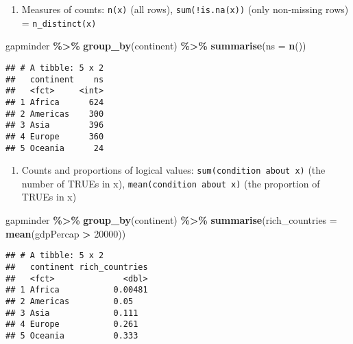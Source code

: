\documentclass[
]{book}
\newenvironment{Shaded}{\begin{snugshade}}{\end{snugshade}}
\newcommand{\DataTypeTok}[1]{\textcolor[rgb]{0.13,0.29,0.53}{#1}}
\newcommand{\DecValTok}[1]{\textcolor[rgb]{0.00,0.00,0.81}{#1}}
\newcommand{\KeywordTok}[1]{\textcolor[rgb]{0.13,0.29,0.53}{\textbf{#1}}}
\newcommand{\NormalTok}[1]{#1}
\newcommand{\OperatorTok}[1]{\textcolor[rgb]{0.81,0.36,0.00}{\textbf{#1}}}
\newcommand{\StringTok}[1]{\textcolor[rgb]{0.31,0.60,0.02}{#1}}
\providecommand{\tightlist}{%
  \setlength{\itemsep}{0pt}\setlength{\parskip}{0pt}}
\begin{document}
\begin{enumerate}
\def\labelenumi{\arabic{enumi}.}
\setcounter{enumi}{3}
\tightlist
\item
  Measures of counts: \texttt{n(x)} (all rows), \texttt{sum(!is.na(x))} (only non-missing rows) = \texttt{n\_distinct(x)}
\end{enumerate}

\begin{Shaded}
\begin{Highlighting}[]
\NormalTok{gapminder }\OperatorTok{\%\textgreater{}\%}
\StringTok{  }\KeywordTok{group\_by}\NormalTok{(continent) }\OperatorTok{\%\textgreater{}\%}
\StringTok{  }\KeywordTok{summarise}\NormalTok{(}\DataTypeTok{ns =} \KeywordTok{n}\NormalTok{())}
\end{Highlighting}
\end{Shaded}

\begin{verbatim}
## # A tibble: 5 x 2
##   continent    ns
##   <fct>     <int>
## 1 Africa      624
## 2 Americas    300
## 3 Asia        396
## 4 Europe      360
## 5 Oceania      24
\end{verbatim}

\begin{enumerate}
\def\labelenumi{\arabic{enumi}.}
\setcounter{enumi}{4}
\tightlist
\item
  Counts and proportions of logical values: \texttt{sum(condition\ about\ x)} (the number of TRUEs in x), \texttt{mean(condition\ about\ x)} (the proportion of TRUEs in x)
\end{enumerate}

\begin{Shaded}
\begin{Highlighting}[]
\NormalTok{gapminder }\OperatorTok{\%\textgreater{}\%}
\StringTok{  }\KeywordTok{group\_by}\NormalTok{(continent) }\OperatorTok{\%\textgreater{}\%}
\StringTok{  }\KeywordTok{summarise}\NormalTok{(}\DataTypeTok{rich\_countries =} \KeywordTok{mean}\NormalTok{(gdpPercap }\OperatorTok{\textgreater{}}\StringTok{ }\DecValTok{20000}\NormalTok{))}
\end{Highlighting}
\end{Shaded}

\begin{verbatim}
## # A tibble: 5 x 2
##   continent rich_countries
##   <fct>              <dbl>
## 1 Africa           0.00481
## 2 Americas         0.05   
## 3 Asia             0.111  
## 4 Europe           0.261  
## 5 Oceania          0.333
\end{verbatim}
\end{document}

